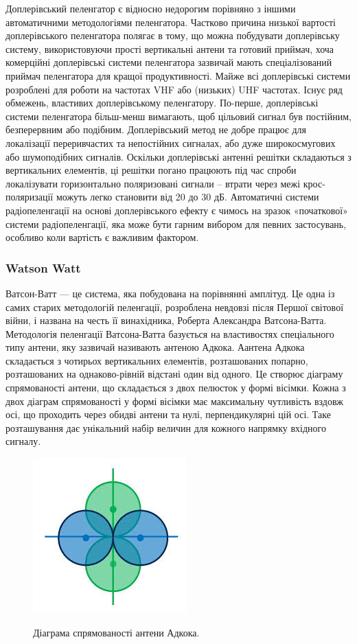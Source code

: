 \documentclass{article}
\begin{document}
Доплерівський пеленгатор є відносно недорогим порівняно з іншими автоматичними методологіями пеленгатора. Частково причина низької вартості доплерівського пеленгатора полягає в тому, що можна побудувати доплерівську систему, використовуючи
прості вертикальні антени та готовий приймач, хоча комерційні доплерівські системи пеленгатора зазвичай мають спеціалізований приймач пеленгатора для кращої продуктивності. Майже всі доплерівські системи розроблені для роботи на частотах VHF або (низьких) UHF частотах. Існує ряд обмежень, властивих доплерівському пеленгатору. По-перше, доплерівські системи пеленгатора більш-менш вимагають, щоб цільовий сигнал був постійним, безперервним або подібним. Доплерівський метод не добре працює для локалізації переривчастих та непостійних сигналах, або дуже широкосмугових або шумоподібних сигналів. Оскільки доплерівські антенні решітки складаються з вертикальних елементів, ці решітки погано працюють під час спроби локалізувати горизонтально поляризовані сигнали – втрати через межі крос-поляризації можуть легко становити від 20 до 30 дБ. Автоматичні системи радіопеленгації на основі доплерівського ефекту є чимось на зразок «початкової» системи радіопеленгації, яка може бути гарним вибором для певних застосувань, особливо коли вартість є важливим фактором.

\subsubsection{Watson Watt}
Ватсон-Ватт — це система, яка побудована на порівнянні амплітуд. Це одна із самих старих методологій пеленгації, розроблена невдовзі після Першої світової війни, і названа на честь її винахідника, Роберта Александра Ватсона-Ватта. Методологія пеленгації Ватсона-Ватта базується на властивостях спеціального типу антени, яку зазвичай називають антеною Адкока. Аантена Адкока складається з чотирьох вертикальних елементів, розташованих попарно, розташованих на однаково-рівній відстані один від одного. Це створює діаграму спрямованості антени, що складається з двох пелюсток у формі вісімки. Кожна з двох діаграм спрямованості у формі вісімки має максимальну чутливість вздовж осі, що проходить через обидві антени та нулі, перпендикулярні цій осі. Таке розташування дає унікальний набір величин для кожного напрямку вхідного сигналу.


\begin{figure}[H]
	\centering
	{\includegraphics[width=0.2\linewidth]{images/adkock_antenna.jpeg}}
	\caption{\label{fig:rdf:dopler} Діаграма спрямованості антени Адкока.}
\end{figure}
\end{document}
